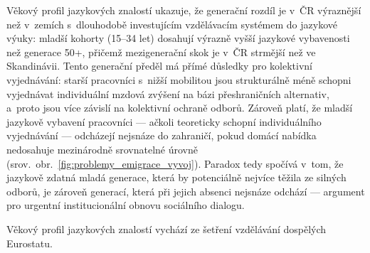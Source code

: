 Věkový profil jazykových znalostí ukazuje, že generační rozdíl je v~ČR výraznější než v~zemích s~dlouhodobě investujícím vzdělávacím systémem do jazykové výuky: mladší kohorty (15--34 let) dosahují výrazně vyšší jazykové vybavenosti než generace 50+, přičemž mezigenerační skok je v~ČR strmější než ve Skandinávii.
Tento generační předěl má přímé důsledky pro kolektivní vyjednávání: starší pracovníci s~nižší mobilitou jsou strukturálně méně schopni vyjednávat individuální mzdová zvýšení na bázi přeshraničních alternativ, a~proto jsou více závislí na kolektivní ochraně odborů.
Zároveň platí, že mladší jazykově vybavení pracovníci --- ačkoli teoreticky schopní individuálního vyjednávání --- odcházejí nejsnáze do zahraničí, pokud domácí nabídka nedosahuje mezinárodně srovnatelné úrovně (srov.~obr.~\ref{fig:problemy_emigrace_vyvoj}).
Paradox tedy spočívá v~tom, že jazykově zdatná mladá generace, která by potenciálně nejvíce těžila ze silných odborů, je zároveň generací, která při jejich absenci nejsnáze odchází --- argument pro urgentní institucionální obnovu sociálního dialogu.

Věkový profil jazykových znalostí vychází ze šetření vzdělávání dospělých Eurostatu.\par



